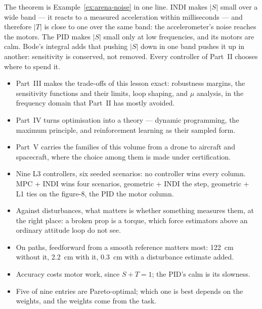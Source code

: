 The theorem is Example~\ref{ex:arena-noise} in one line. INDI makes $|S|$ small over a wide band — it reacts to a measured acceleration within milliseconds — and therefore $|T|$ is close to one over the same band: the accelerometer's noise reaches the motors. The PID makes $|S|$ small only at low frequencies, and its motors are calm. Bode's integral adds that pushing $|S|$ down in one band pushes it up in another: sensitivity is conserved, not removed. Every controller of Part~II chooses where to spend it.

\begin{lookahead}
\begin{itemize}[leftmargin=1.2em]
  \item Part~III makes the trade-offs of this lesson exact: robustness margins, the sensitivity functions and their limits, loop shaping, and $\mu$ analysis, in the frequency domain that Part~II has mostly avoided.
  \item Part~IV turns optimisation into a theory — dynamic programming, the maximum principle, and reinforcement learning as their sampled form.
  \item Part~V carries the families of this volume from a drone to aircraft and spacecraft, where the choice among them is made under certification.
\end{itemize}
\end{lookahead}

\begin{remember}
\begin{itemize}
  \item Nine L3 controllers, six seeded scenarios: no controller wins every column. MPC + INDI wins four scenarios, geometric + INDI the step, geometric + L1 ties on the figure-8, the PID the motor column.
  \item Against disturbances, what matters is whether something measures them, at the right place: a broken prop is a torque, which force estimators above an ordinary attitude loop do not see.
  \item On paths, feedforward from a smooth reference matters most: \SI{122}{cm} without it, \SI{2.2}{cm} with it, \SI{0.3}{cm} with a disturbance estimate added.
  \item Accuracy costs motor work, since $S + T = 1$; the PID's calm is its slowness.
  \item Five of nine entries are Pareto-optimal; which one is best depends on the weights, and the weights come from the task.
\end{itemize}
\end{remember}

